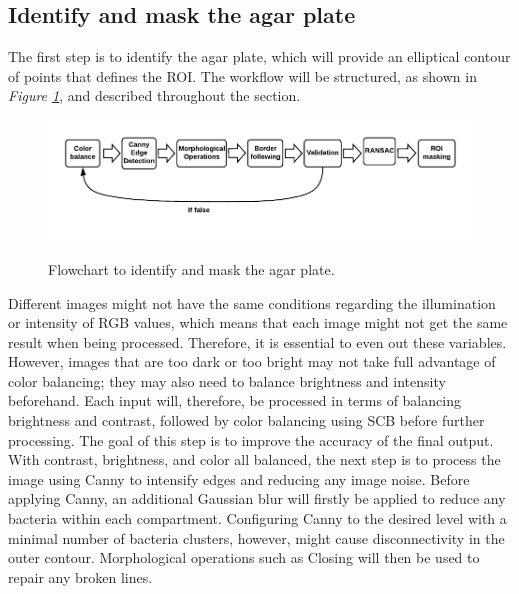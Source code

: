 \subsection{Identify and mask the agar plate}
The first step is to identify the agar plate, which will provide an elliptical contour of points that defines the ROI. The workflow will be structured, as shown in \textit{Figure \ref{fig:identify and mask flowchart}}, and described throughout the section. 
\begin{figure}[H]
    \centering
    \includegraphics[width=1\linewidth]{figures/PDF/Identify and mask agar plate.pdf}\\
    \caption{Flowchart to identify and mask the agar plate.}
    \label{fig:identify and mask flowchart}
\end{figure}


\noindent Different images might not have the same conditions regarding the illumination or intensity of RGB values, which means that each image might not get the same result when being processed.  Therefore, it is essential to even out these variables. However, images that are too dark or too bright may not take full advantage of color balancing; they may also need to balance brightness and intensity beforehand.  Each input will, therefore, be processed in terms of balancing brightness and contrast, followed by color balancing using SCB before further processing. The goal of this step is to improve the accuracy of the final output. \\

\noindent With contrast, brightness, and color all balanced, the next step is to process the image using Canny to intensify edges and reducing any image noise. Before applying Canny, an additional Gaussian blur will firstly be applied to reduce any bacteria within each compartment. Configuring Canny to the desired level with a minimal number of bacteria clusters, however, might cause disconnectivity in the outer contour. Morphological operations such as Closing will then be used to repair any broken lines. \\ 


